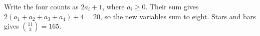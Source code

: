 Write the four counts as $2a_i+1$, where $a_i\ge0$. Their sum gives $2(a_1+a_2+a_3+a_4)+4=20$, so the new variables sum to eight. Stars and bars gives $\boxed{\binom{11}{3}=165}$.
